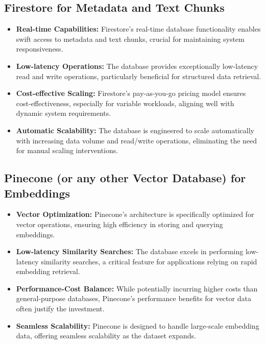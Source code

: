 \documentclass[a4paper, 12pt]{report}
\begin{document}
\subsection{Firestore for Metadata and Text Chunks}
\begin{itemize}
    \item \textbf{Real-time Capabilities:} Firestore's real-time database functionality enables swift access to metadata and text chunks, crucial for maintaining system responsiveness.
    \item \textbf{Low-latency Operations:} The database provides exceptionally low-latency read and write operations, particularly beneficial for structured data retrieval.
    \item \textbf{Cost-effective Scaling:} Firestore's pay-as-you-go pricing model ensures cost-effectiveness, especially for variable workloads, aligning well with dynamic system requirements.
    \item \textbf{Automatic Scalability:} The database is engineered to scale automatically with increasing data volume and read/write operations, eliminating the need for manual scaling interventions.
\end{itemize}

\subsection{Pinecone (or any other Vector Database) for Embeddings}
\begin{itemize}
    \item \textbf{Vector Optimization:} Pinecone's architecture is specifically optimized for vector operations, ensuring high efficiency in storing and querying embeddings.
    \item \textbf{Low-latency Similarity Searches:} The database excels in performing low-latency similarity searches, a critical feature for applications relying on rapid embedding retrieval.
    \item \textbf{Performance-Cost Balance:} While potentially incurring higher costs than general-purpose databases, Pinecone's performance benefits for vector data often justify the investment.
    \item \textbf{Seamless Scalability:} Pinecone is designed to handle large-scale embedding data, offering seamless scalability as the dataset expands.
\end{itemize}
\end{document}

